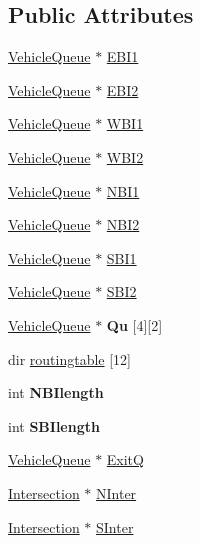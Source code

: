 \subsection*{Public Attributes}
\begin{DoxyCompactItemize}
\item 
\hyperlink{class_vehicle_queue}{Vehicle\-Queue} $\ast$ \hyperlink{class_intersection_a8a64af1004807f4ac451bcf9bfa368a4}{E\-B\-I1}
\item 
\hyperlink{class_vehicle_queue}{Vehicle\-Queue} $\ast$ \hyperlink{class_intersection_a8db85628804847f2b98fd1edf5c28e34}{E\-B\-I2}
\item 
\hyperlink{class_vehicle_queue}{Vehicle\-Queue} $\ast$ \hyperlink{class_intersection_a7d4afb62f4051e6f25c0195de1d66442}{W\-B\-I1}
\item 
\hyperlink{class_vehicle_queue}{Vehicle\-Queue} $\ast$ \hyperlink{class_intersection_a7f4c7a9c2344827a24aaa52955e56fac}{W\-B\-I2}
\item 
\hyperlink{class_vehicle_queue}{Vehicle\-Queue} $\ast$ \hyperlink{class_intersection_aba3182ae5b832420344bc8fccf5c285b}{N\-B\-I1}
\item 
\hyperlink{class_vehicle_queue}{Vehicle\-Queue} $\ast$ \hyperlink{class_intersection_af19480d80bcd05c9b3d6fff9e1e829d7}{N\-B\-I2}
\item 
\hyperlink{class_vehicle_queue}{Vehicle\-Queue} $\ast$ \hyperlink{class_intersection_a0f60a7d5b4911fbc309ddecdab4a75e7}{S\-B\-I1}
\item 
\hyperlink{class_vehicle_queue}{Vehicle\-Queue} $\ast$ \hyperlink{class_intersection_a172b271e9434b824c4722b1589d77f55}{S\-B\-I2}
\item 
\hypertarget{class_intersection_ac2ed4059bdd3c08bb3fd62eaf1a89f73}{\hyperlink{class_vehicle_queue}{Vehicle\-Queue} $\ast$ {\bfseries Qu} \mbox{[}4\mbox{]}\mbox{[}2\mbox{]}}\label{class_intersection_ac2ed4059bdd3c08bb3fd62eaf1a89f73}

\item 
dir \hyperlink{class_intersection_a87a7802a02ff65c92a6fd11c70144ca2}{routingtable} \mbox{[}12\mbox{]}
\item 
\hypertarget{class_intersection_a23e3dd72ef9a1e4fa82da6a503b61626}{int {\bfseries N\-B\-Ilength}}\label{class_intersection_a23e3dd72ef9a1e4fa82da6a503b61626}

\item 
\hypertarget{class_intersection_a11b364d7355af20e013e2217596588ec}{int {\bfseries S\-B\-Ilength}}\label{class_intersection_a11b364d7355af20e013e2217596588ec}

\item 
\hyperlink{class_vehicle_queue}{Vehicle\-Queue} $\ast$ \hyperlink{class_intersection_a2456746faabd194633c2b133440449c6}{Exit\-Q}
\item 
\hyperlink{class_intersection}{Intersection} $\ast$ \hyperlink{class_intersection_a577edea4aa08d05052e6cbf7aa2ba9e2}{N\-Inter}
\item 
\hyperlink{class_intersection}{Intersection} $\ast$ \hyperlink{class_intersection_af6cfb23dbc2ad5b1d90752247dd07acf}{S\-Inter}
\end{DoxyCompactItemize}
